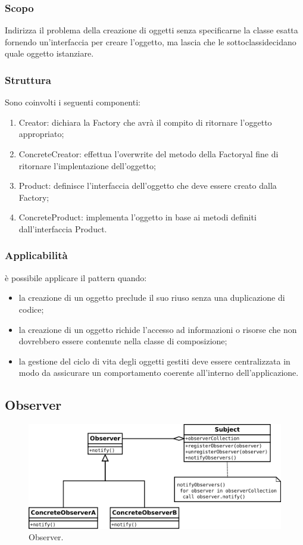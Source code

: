 \subsubsection{Scopo} Indirizza il problema della creazione di oggetti senza specificarne la classe esatta fornendo un'interfaccia per creare l'oggetto, ma lascia che le sottoclassidecidano quale oggetto istanziare.

\subsubsection{Struttura} Sono coinvolti i seguenti componenti:

\begin{enumerate}
	\item Creator: dichiara la Factory che avrà il compito di ritornare l'oggetto appropriato;
	\item ConcreteCreator: effettua l'overwrite del metodo della Factoryal fine di ritornare l'implentazione dell'oggetto;
	\item Product: definisce l'interfaccia dell'oggetto che deve essere creato dalla Factory;
	\item ConcreteProduct: implementa l'oggetto in base ai metodi  definiti dall'interfaccia Product.
\end{enumerate}

\subsubsection{Applicabilità} è possibile applicare il pattern quando:

\begin{itemize}
	\item la creazione di un oggetto preclude il suo riuso senza una duplicazione di codice;
	\item la creazione di un oggetto richide l'accesso ad informazioni o risorse che non dovrebbero essere contenute nella classe di composizione;
	\item la gestione del ciclo di vita degli oggetti gestiti deve essere centralizzata in modo da assicurare un comportamento coerente all'interno dell'applicazione.
\end{itemize}

\subsection{Observer}

\begin{figure} \label{fig:observer}
	\includegraphics[scale=0.5]{img/observer.png}
	\caption{Observer.}
\end{figure}

